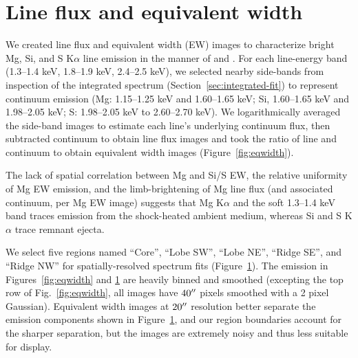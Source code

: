 \documentclass[twocolumn,tighten,trackchanges]{aastex61}
\begin{document}

\section{Line flux and equivalent width}

We created line flux and equivalent width (EW) images to characterize bright
Mg, Si, and S K$\alpha$ line emission in the manner of \citet{vink1999} and
\citet{hwang2000}.
For each line-energy band (1.3--1.4 keV, 1.8--1.9 keV, 2.4--2.5 keV), we
selected nearby side-bands from inspection of the integrated spectrum
(Section~\ref{sec:integrated-fit}) to represent continuum emission
(Mg: 1.15--1.25 keV and 1.60--1.65 keV; Si, 1.60--1.65 keV and 1.98--2.05 keV;
S: 1.98--2.05 keV to 2.60--2.70 keV).
We logarithmically averaged the side-band images to estimate each line's
underlying continuum flux, then subtracted continuum to obtain line flux images
and took the ratio of line and continuum to obtain equivalent width images
(Figure~\ref{fig:eqwidth}).

The lack of spatial correlation between Mg and Si/S EW, the relative
uniformity of Mg EW emission, and the limb-brightening of Mg line flux
(and associated continuum, per Mg EW image) suggests that Mg K$\alpha$
and the soft 1.3--1.4 keV band traces emission from the shock-heated ambient
medium, whereas Si and S K$\alpha$ trace remnant ejecta.

We select five regions named ``Core'', ``Lobe SW'', ``Lobe NE'', ``Ridge SE'',
and ``Ridge NW'' for spatially-resolved spectrum fits (Figure~\ref{fig:rgb}).
The emission in Figures~\ref{fig:eqwidth} and \ref{fig:rgb} are heavily binned
and smoothed (excepting the top row of Fig.~\ref{fig:eqwidth}, all images have
$40\mbox{$^{\prime\prime}$}$ pixels smoothed with a 2 pixel Gaussian).
Equivalent width images at $20\mbox{$^{\prime\prime}$}$ resolution better separate the emission
components shown in Figure~\ref{fig:rgb}, and our region boundaries account for
the sharper separation, but the images are extremely noisy and thus less
suitable for display.

\begin{figure}[]
    \label{fig:rgb}
\end{figure}
\end{document}
